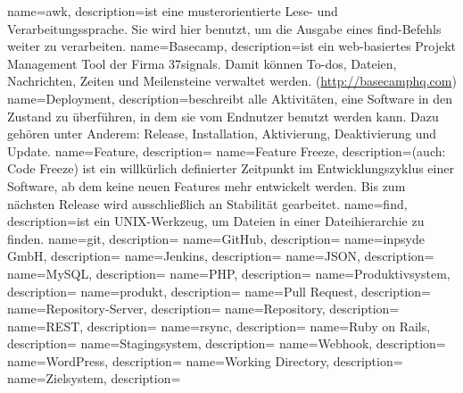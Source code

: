  {
  name=awk,
  description={ist eine musterorientierte Lese- und Verarbeitungssprache. Sie wird hier benutzt, um die Ausgabe eines \gls{find}-Befehls weiter zu verarbeiten.\cite{manpage_awk}}
}
 {
  name=Basecamp,
  description={ist ein web-basiertes Projekt Management Tool der Firma 37signals. Damit können To-dos, Dateien, Nachrichten, Zeiten und Meilensteine verwaltet werden. (\url{http://basecamphq.com})}
}
 {
  name=Deployment,
  description={beschreibt alle Aktivitäten, eine Software in den Zustand zu überführen, in dem sie vom Endnutzer benutzt werden kann. Dazu gehören unter Anderem: Release, Installation, Aktivierung, Deaktivierung und Update.\cite{deployment_tech}}
}
 {
  name=Feature,
  description={}
}
 {
  name=Feature Freeze,
  description={(auch: Code Freeze) ist ein willkürlich definierter Zeitpunkt im Entwicklungszyklus einer Software, ab dem keine neuen Features mehr entwickelt werden. Bis zum nächsten Release wird ausschließlich an Stabilität gearbeitet.\cite[S.298]{praxiswissen_softwareing}}
}
 {
  name=find,
  description={ist ein UNIX-Werkzeug, um Dateien in einer Dateihierarchie zu finden.\cite{manpage_find}}
}
 {
  name=git,
  description={}
}
 {
  name=GitHub,
  description={}
}
 {
  name=inpsyde GmbH,
  description={}
}
 {
  name=Jenkins,
  description={}
}
 {
  name=JSON,
  description={}
}
 {
  name=MySQL,
  description={}
}
 {
  name=PHP,
  description={}
}
 {
  name=Produktivsystem,
  description={}
}
 {
  name=produkt,
  description={}
}
 {
  name=Pull Request,
  description={}
}
 {
  name=Repository-Server,
  description={}
}
 {
  name=Repository,
  description={}
}
 {
  name=REST,
  description={}
}
 {
  name=rsync,
  description={}
}
 {
  name=Ruby on Rails,
  description={}
}
 {
  name=Stagingsystem,
  description={}
}
 {
  name=Webhook,
  description={}
}
 {
  name=WordPress,
  description={}
}
 {
  name=Working Directory,
  description={}
}
 {
  name=Zielsystem,
  description={}
}


\makeglossaries